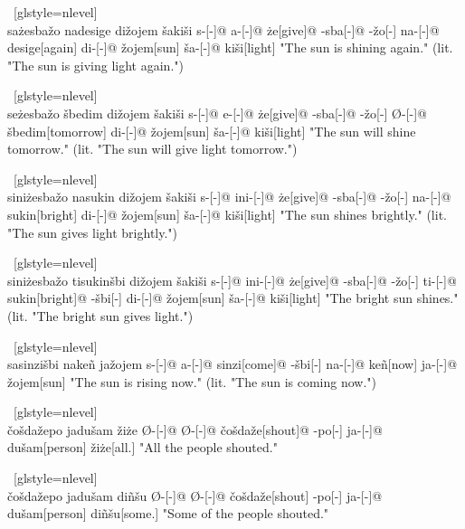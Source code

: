 \ex~[glstyle=nlevel]
\begingl
\glpreamble {} \\ sażesbažo nadesige dižojem šakiši
\endpreamble
s-[{\Ind}-]@
a-[{\Prog}-]@
że[give]@
-sba[-{\Inan}]@
-žo[-{\Inan}]
na-[{\Prog}-]@
desige[again]
di-[{\Erg}-]@
žojem[sun]
ša-[{\Acc}-]@
kiši[light]
\glft "The sun is shining again." (lit. "The sun is giving light again.")
\endgl
\xe

\ex~[glstyle=nlevel]
\begingl
\glpreamble {} \\ seżesbažo šbedim dižojem šakiši
\endpreamble
s-[{\Ind}-]@
e-[{\Pfv}-]@
że[give]@
-sba[-{\Inan}]@
-žo[-{\Inan}]
Ø-[{\Pfv}-]@
šbedim[tomorrow]
di-[{\Erg}-]@
žojem[sun]
ša-[{\Acc}-]@
kiši[light]
\glft "The sun will shine tomorrow." (lit. "The sun will give light tomorrow.")
\endgl
\xe

\ex~[glstyle=nlevel]
\begingl
\glpreamble {} \\ siniżesbažo nasukin dižojem šakiši
\endpreamble
s-[{\Ind}-]@
ini-[{\Hab}-]@
że[give]@
-sba[-{\Inan}]@
-žo[-{\Inan}]
na-[{\Prog}-]@
sukin[bright]
di-[{\Erg}-]@
žojem[sun]
ša-[{\Acc}-]@
kiši[light]
\glft "The sun shines brightly." (lit. "The sun gives light brightly.")
\endgl
\xe

\ex~[glstyle=nlevel]
\begingl 
\glpreamble {} \\ siniżesbažo tisukinšbi dižojem šakiši
\endpreamble
s-[{\Ind}-]@
ini-[{\Hab}-]@
że[give]@
-sba[-{\Inan}]@
-žo[-{\Inan}]
ti-[{\Erg}-]@
sukin[bright]@
-šbi[-{\Inan}]
di-[{\Erg}-]@
žojem[sun]
ša-[{\Acc}-]@
kiši[light]
\glft "The bright sun shines." (lit. "The bright sun gives light.")
\endgl
\xe

\ex~[glstyle=nlevel]
\begingl
\glpreamble {} \\ sasinzišbi nakeñ jažojem
\endpreamble
s-[{\Ind}-]@
a-[{\Prog}-]@
sinzi[come]@
-šbi[-{\Inan}]
na-[{\Prog}-]@
keñ[now]
ja-[{\Nom}-]@
žojem[sun]
\glft "The sun is rising now." (lit. "The sun is coming now.")
\endgl
\xe

\ex~[glstyle=nlevel]
\begingl 
\glpreamble {} \\ čošdažepo jadušam žiże
\endpreamble
Ø-[{\Ind}-]@
Ø-[{\Pfv}-]@
čošdaže[shout]@
-po[-{\Hg}]
ja-[{\Nom}-]@
dušam[person]
žiże[all.{\Hg}]
\glft "All the people shouted."
\endgl
\xe

\ex~[glstyle=nlevel]
\begingl
\glpreamble {} \\ čošdažepo jadušam diñšu
\endpreamble
Ø-[{\Ind}-]@
Ø-[{\Pfv}-]@
čošdaže[shout]
-po[-{\Hg}]
ja-[{\Nom}-]@
dušam[person]
diñšu[some.{\Hg}]
\glft "Some of the people shouted."
\endgl
\xe

